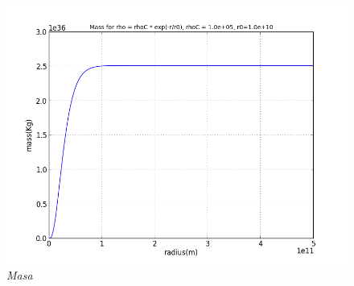 \documentclass[12pt]{book}
\begin{document}
\begin{description}
\begin{figure}[!ht]
 \centering
 \includegraphics[scale=0.4]{massAn.png}
 \caption{\emph{Masa}}
\end{figure}


\end{description}




\newpage
\end{document}
